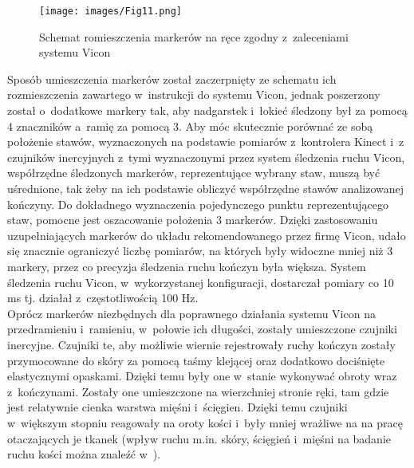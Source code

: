 \begin{figure}[!htp]
	\centering
	\texttt{[image: images/Fig11.png]}
	\caption{Schemat romieszczenia markerów na ręce zgodny z~zaleceniami systemu Vicon}
	\label{fig:experiments:viconArm}
\end{figure}

Sposób umieszczenia markerów został zaczerpnięty ze schematu ich rozmieszczenia zawartego w~instrukcji do systemu Vicon, jednak poszerzony został o~dodatkowe markery tak, aby nadgarstek i~łokieć śledzony był za pomocą 4 znaczników a~ramię za pomocą 3. Aby móc skutecznie porównać ze sobą położenie stawów, wyznaczonych na podstawie pomiarów z~kontrolera Kinect i~z czujników inercyjnych z~tymi wyznaczonymi przez system śledzenia ruchu Vicon, współrzędne śledzonych markerów, reprezentujące wybrany staw, muszą być uśrednione, tak żeby na ich podstawie obliczyć współrzędne stawów analizowanej kończyny. Do dokładnego wyznaczenia pojedynczego punktu reprezentującego staw, pomocne jest 
oszacowanie położenia 3 markerów. Dzięki zastosowaniu uzupełniających markerów do układu rekomendowanego przez firmę Vicon, udało się znacznie ograniczyć liczbę pomiarów, na których były widoczne mniej niż 3 markery, przez co precyzja śledzenia ruchu kończyn była większa. System śledzenia ruchu Vicon, w~wykorzystanej konfiguracji, dostarczał pomiary co 10 ms tj. działał z~częstotliwością 100 Hz.  \\ 

Oprócz markerów niezbędnych dla poprawnego działania systemu Vicon na przedramieniu i~ramieniu, w~połowie ich długości, zostały umieszczone czujniki inercyjne. Czujniki te, aby możliwie wiernie rejestrowały ruchy kończyn zostały przymocowane do skóry za pomocą taśmy klejącej oraz dodatkowo dociśnięte elastycznymi opaskami. Dzięki temu były one w~stanie wykonywać obroty wraz z~kończynami. Zostały one umieszczone na wierzchniej stronie ręki, tam gdzie jest relatywnie cienka warstwa mięśni i~ścięgien. Dzięki temu czujniki w~większym stopniu reagowały na oroty kości i~były mniej wrażliwe na na pracę otaczających je tkanek (wpływ ruchu m.in. skóry, ścięgień i~mięśni na badanie ruchu kości można znaleźć w~\cite{Sati2016,Reinschmidt2016}).

